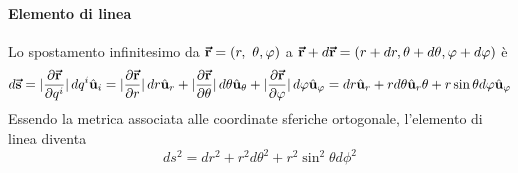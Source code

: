 \paragraph{Elemento di linea}
Lo spostamento infinitesimo da $\vb*{\va{r}}=(r,\ \theta, \varphi)$ a $\vb*{\va{r}}+d\vb*{\va{r}}=(r + dr, \theta + d\theta, \varphi + d\varphi)$ è
\begin{equation}
	d\vb*{\va{s}}=\abs*{\pdv{\vb*{\va{r}}}{q^i}}dq^i\hat{\mathbf{u}}_i=\abs*{\pdv{\vb*{\va{r}}}{r}}dr\hat{\mathbf{u}}_r+\abs*{\pdv{\vb*{\va{r}}}{\theta}}d\theta\hat{\mathbf{u}}_\theta+\abs*{\pdv{\vb*{\va{r}}}{\varphi}}d\varphi\hat{\mathbf{u}}_\varphi=dr\hat{\mathbf{u}}_r+rd\theta\hat{\mathbf{u}}_r\theta+r\sin\theta d\varphi\hat{\mathbf{u}}_\varphi\label{spinfinitesimosferiche}
\end{equation}
Essendo la metrica associata alle coordinate sferiche ortogonale, l'elemento di linea diventa
\begin{equation}
	ds^2=dr^2+r^2d\theta^2+r^2\sin^2\theta d\phi^2
\end{equation}
